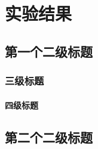 \chapter*{实验结果}
    \section*{第一个二级标题}
        \subsection*{三级标题}
            \subsubsection*{四级标题}
    \section*{第二个二级标题}